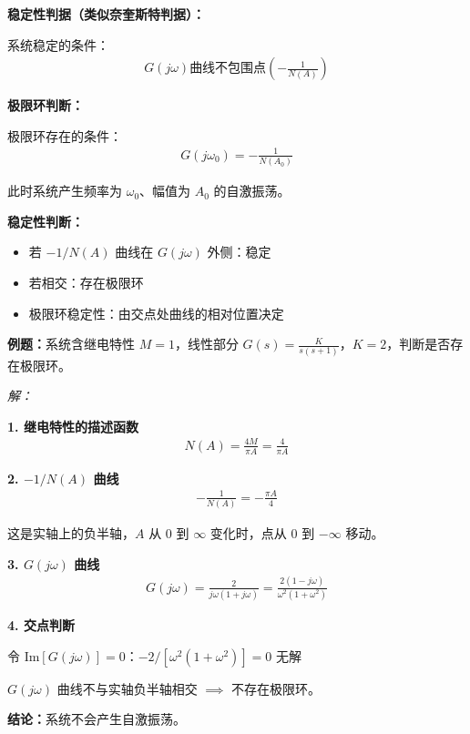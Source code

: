 \textbf{稳定性判据（类似奈奎斯特判据）：}

系统稳定的条件：
\begin{align*}
G(j\omega) \text{曲线不包围点} \left(-\frac{1}{N(A)}\right)
\end{align*}

\textbf{极限环判断：}

极限环存在的条件：
\begin{align*}
G(j\omega_0) = -\frac{1}{N(A_0)}
\end{align*}

此时系统产生频率为 $\omega_0$、幅值为 $A_0$ 的自激振荡。

\vspace{0.3cm}
\textbf{稳定性判断：}

\begin{itemize}
    \item 若 $-1/N(A)$ 曲线在 $G(j\omega)$ 外侧：稳定
    \item 若相交：存在极限环
    \item 极限环稳定性：由交点处曲线的相对位置决定
\end{itemize}

\vspace{0.3cm}
\textbf{例题：}系统含继电特性 $M=1$，线性部分 $G(s) = \frac{K}{s(s+1)}$，$K=2$，判断是否存在极限环。

\textit{解：}

\textbf{1. 继电特性的描述函数}
\begin{align*}
N(A) = \frac{4M}{\pi A} = \frac{4}{\pi A}
\end{align*}

\textbf{2. $-1/N(A)$ 曲线}
\begin{align*}
-\frac{1}{N(A)} = -\frac{\pi A}{4}
\end{align*}

这是实轴上的负半轴，$A$ 从 $0$ 到 $\infty$ 变化时，点从 $0$ 到 $-\infty$ 移动。

\textbf{3. $G(j\omega)$ 曲线}
\begin{align*}
G(j\omega) = \frac{2}{j\omega(1+j\omega)} = \frac{2(1-j\omega)}{\omega^2(1+\omega^2)}
\end{align*}

\textbf{4. 交点判断}

令 $\text{Im}[G(j\omega)] = 0$：$-2/[\omega^2(1+\omega^2)] = 0$ 无解

$G(j\omega)$ 曲线不与实轴负半轴相交 $\implies$ 不存在极限环。

\textbf{结论：}系统不会产生自激振荡。

